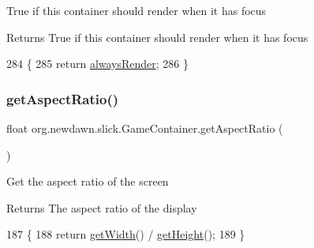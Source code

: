 True if this container should render when it has focus

\begin{DoxyReturn}{Returns}
True if this container should render when it has focus 
\end{DoxyReturn}

\begin{DoxyCode}
284                                       \{
285         \textcolor{keywordflow}{return} \mbox{\hyperlink{classorg_1_1newdawn_1_1slick_1_1_game_container_afc21372962046ca458a65fbd22fe4905}{alwaysRender}};
286     \}
\end{DoxyCode}
\mbox{\label{classorg_1_1newdawn_1_1slick_1_1_game_container_a5be60e50a359e3bb3861e06a8b149901}} 
\subsubsection{\texorpdfstring{get\+Aspect\+Ratio()}{getAspectRatio()}}
{\footnotesize\ttfamily float org.\+newdawn.\+slick.\+Game\+Container.\+get\+Aspect\+Ratio (\begin{DoxyParamCaption}{ }\end{DoxyParamCaption})\hspace{0.3cm}{\ttfamily [inline]}}

Get the aspect ratio of the screen

\begin{DoxyReturn}{Returns}
The aspect ratio of the display 
\end{DoxyReturn}

\begin{DoxyCode}
187                                   \{
188         \textcolor{keywordflow}{return} \mbox{\hyperlink{classorg_1_1newdawn_1_1slick_1_1_game_container_a938fe1a28567182445e60450915d5f69}{getWidth}}() / \mbox{\hyperlink{classorg_1_1newdawn_1_1slick_1_1_game_container_a7eff88473fe5715fdfc2f92e8cb48521}{getHeight}}();
189     \}
\end{DoxyCode}
\mbox{\label{classorg_1_1newdawn_1_1slick_1_1_game_container_a3f678756d7085368d56a710127d7dd67}} 
